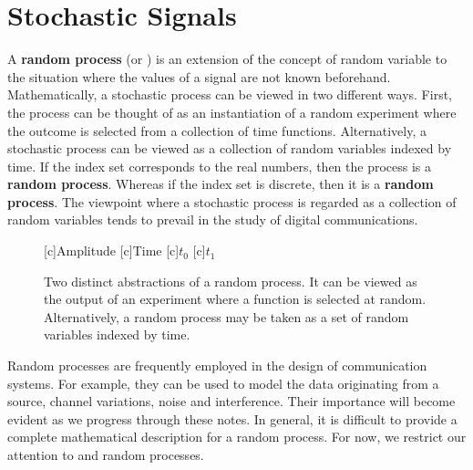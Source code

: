 \newpage
\section{Stochastic Signals}
\label{section:StocahsticSignalsFAS}

A \textbf{random process} (or ) is an extension of the concept of random variable to the situation where the values of a signal are not known beforehand.
Mathematically, a stochastic process can be viewed in two different ways.
First, the process can be thought of as an instantiation of a random experiment where the outcome is selected from a collection of time functions.
Alternatively, a stochastic process can be viewed as a collection of random variables indexed by time.
If the index set corresponds to the real numbers, then the process is a  \textbf{random process}.
Whereas if the index set is discrete, then it is a  \textbf{random process}.
The viewpoint where a stochastic process is regarded as a collection of random variables tends to prevail in the study of digital communications.
\begin{figure}[htbp]
\begin{center}
\begin{psfrags}
[c]{Amplitude}
[c]{Time}
[c]{$t_0$}
[c]{$t_1$}
\end{psfrags}
\caption{Two distinct abstractions of a random process.
It can be viewed as the output of an experiment where a function is selected at random.
Alternatively, a random process may be taken as a set of random variables indexed by time.}
\label{figure:RandomProcess}
\end{center}
\end{figure}

Random processes are frequently employed in the design of communication systems.
For example, they can be used to model the data originating from a source, channel variations, noise and interference.
Their importance will become evident as we progress through these notes.
In general, it is difficult to provide a complete mathematical description for a random process.
For now, we restrict our attention to  and  random processes.

